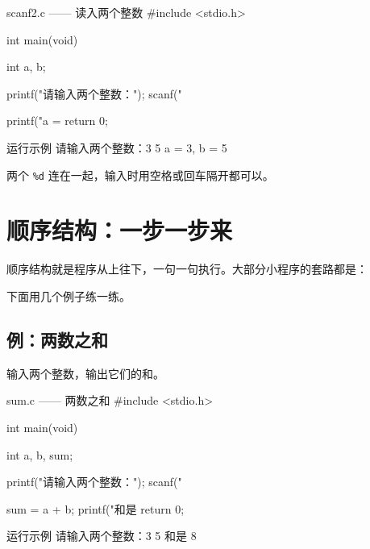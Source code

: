 \begin{codebox}{scanf2.c —— 读入两个整数}
#include <stdio.h>

int main(void)
{
    int a, b;

    printf("请输入两个整数：");
    scanf("%

    printf("a = %
    return 0;
}
\end{codebox}

\begin{outbox}{运行示例}
请输入两个整数：3 5
a = 3, b = 5
\end{outbox}

两个 \texttt{\%d} 连在一起，输入时用空格或回车隔开都可以。

\section{顺序结构：一步一步来}

顺序结构就是程序从上往下，一句一句执行。大部分小程序的套路都是：

\begin{center}
\end{center}

下面用几个例子练一练。

\subsection{例：两数之和}

\begin{example}
输入两个整数，输出它们的和。
\end{example}
\begin{solution}
\begin{codebox}{sum.c —— 两数之和}
#include <stdio.h>

int main(void)
{
    int a, b, sum;

    printf("请输入两个整数：");
    scanf("%

    sum = a + b;
    printf("和是 %
    return 0;
}
\end{codebox}

\begin{outbox}{运行示例}
请输入两个整数：3 5
和是 8
\end{outbox}
\end{solution}

